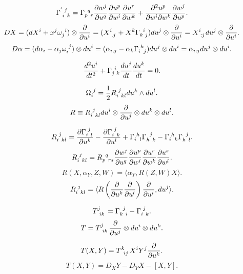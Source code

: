 \begin{newprop}
\[\tensor{\Gamma}{^'_i^j_k} = \tensor{\Gamma}{_p^q_r} \frac{\partial w^j}{\partial u^q} \frac{\partial u^p}{\partial w^i} \frac{\partial u^r}{\partial w^k} + \frac{\partial^2 u^p}{\partial w^i \partial w^k} \frac{\partial w^j}{\partial u^p}.\]
\[DX = (dX^i + x^j \tensor{\omega}{_j^i})\otimes \frac{\partial}{\partial u^i} = (\tensor{X}{^i_{,j}} + X^k \tensor{\Gamma}{_k^i_j}) du^j \otimes \frac{\partial}{\partial u^i} = \tensor{X}{^i_{;j}}du^j \otimes \frac{\partial}{\partial u^i} .\]
\[D \alpha = (d\alpha_i - \alpha_j \tensor{\omega}{_i^j})\otimes du^i = (\alpha_{i,j} -\alpha_k \tensor{\Gamma}{_i^k_j})du^j \otimes du^i = \alpha_{i;j} du^j \otimes du^i .\]
\end{newprop}

\begin{newdef}
\[\frac{d^2 u^i}{dt^2} + \tensor{\Gamma}{_j^i_k} \frac{du^j}{dt} \frac{du^k}{dt} = 0.\]
\end{newdef}

\begin{newdef}
\[\tensor{\Omega}{_i^j} = \frac{1}{2}\tensor{R}{_i^j_{kl}} du^k \wedge du^l .\]
\[R \equiv \tensor{R}{_i^j_{kl}} du^{i} \otimes \frac{\partial}{\partial u^j} \otimes du^{k} \otimes du^{l}.\]
\end{newdef}

\begin{newprop}
\[\tensor{R}{_i^j_{kl}} = \frac{\partial \tensor{\Gamma}{_i^j_l}}{\partial u^k} - \frac{\partial \tensor{\Gamma}{_i^j_k}}{\partial u^l} + \tensor{\Gamma}{_i^h_l} \tensor{\Gamma}{_h^j_k} - \tensor{\Gamma}{_i^h_k} \tensor{\Gamma}{_h^j_l}.\]
\[\tensor{R}{_i^j_{kl}} =\tensor{R}{_p^q_{rs}} \frac{\partial w^j}{\partial u^q} \frac{\partial u^p}{\partial w^i} \frac{\partial u^r}{\partial w^k}\frac{\partial u^s}{\partial w^l}.\]
\[R(X,\alpha_Y,Z,W)= \langle \alpha_Y,R(Z,W)X \rangle.\]
\[\tensor{R}{_i^j_{kl}} = \langle R\left(\frac{\partial}{\partial u^k} \frac{\partial}{\partial u^l}\right)\frac{\partial}{\partial u^i},du^j \rangle.\]
\end{newprop}

\begin{newdef}
\[\tensor{T}{^j_{ik}} = \tensor{\Gamma}{_k^j_i} -\tensor{\Gamma}{_i^j_k}.\]
\[T = \tensor{T}{^j_{ik}} \frac{\partial}{\partial u^j} \otimes du^i \otimes du^k.\]
\end{newdef}

\begin{newprop}
\[T(X,Y) = \tensor{T}{^k_{ij}} X^i Y^j \frac{\partial}{\partial u^k}.\]
\[T(X,Y) = D_X Y - D_Y X - [X,Y].\]
\end{newprop}

